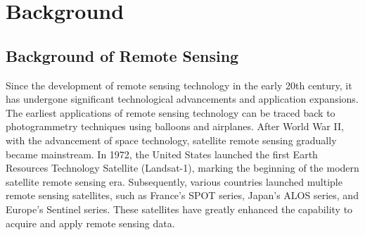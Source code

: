 \section{Background}

\subsection{Background of Remote Sensing}

Since the development of remote sensing technology in the early 20th century, it has undergone significant technological advancements and application expansions. The earliest applications of remote sensing technology can be traced back to photogrammetry techniques using balloons and airplanes\cite{bastiaanssenRemoteSensingIrrigated2000}. After World War II, with the advancement of space technology, satellite remote sensing gradually became mainstream. In 1972, the United States launched the first Earth Resources Technology Satellite (Landsat-1), marking the beginning of the modern satellite remote sensing era. Subsequently, various countries launched multiple remote sensing satellites, such as France's SPOT series\cite{SPOTsate81:online}, Japan's ALOS series\cite{Advanced84:online}, and Europe's Sentinel series\cite{Sentinel88:online}. These satellites have greatly enhanced the capability to acquire and apply remote sensing data.

